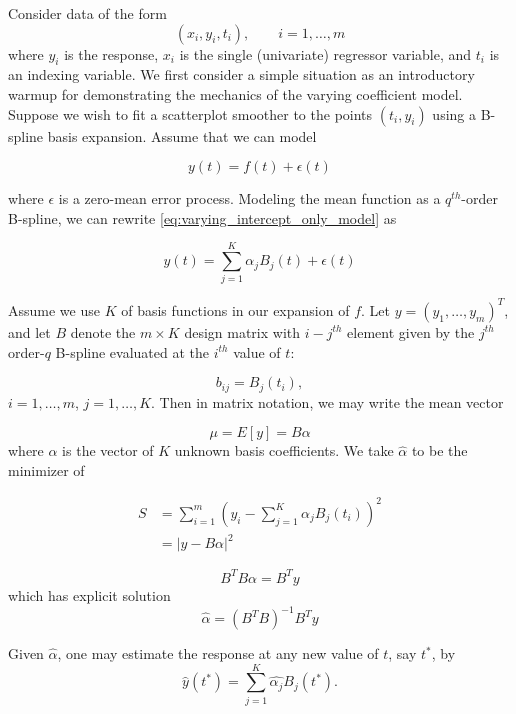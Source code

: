 \documentclass[12pt]{article}
\begin{document}
Consider data of the form 
\[
\left(x_i, y_i, t_i\right), \qquad i=1,\dots,m
\]
where $y_i$ is the response, $x_i$ is the single (univariate) regressor variable, and $t_i$ is an indexing variable. We first consider a simple situation as an introductory warmup for demonstrating the mechanics of the varying coefficient model. Suppose we wish to fit a scatterplot smoother to the points $\left(t_i, y_i\right)$ using a B-spline basis expansion. Assume that we can model 

\begin{equation} \label{eq:varying_intercept_only_model}
y\left(t\right) = f\left(t\right) + \epsilon\left(t \right)
\end{equation}

where $\epsilon$ is a zero-mean error process.  Modeling the mean function as a $q^{th}$-order B-spline, we can rewrite \ref{eq:varying_intercept_only_model} as

\begin{equation} \label{eq:varying_intercept_only_model_bspline}
y\left(t\right) = \sum_{j=1}^{K} \alpha_j B_j\left(t\right) + \epsilon\left(t \right)
\end{equation}

Assume we use $K$ of basis functions in our expansion of $f$. Let $y= \left(y_1,\dots,y_m\right)^T$, and let $B$ denote the $m \times K$ design matrix with $i-j^{th}$ element given by the $j^{th}$ order-$q$ B-spline evaluated at the $i^{th}$ value of $t$: 

\[
b_{ij} = B_j\left(t_i\right),
\]
$i=1,\dots,m$, $j=1,\dots,K$. Then in matrix notation, we may write the mean vector

\[
\mu = E\left[y\right] = B\alpha
\]
\noindent
where $\alpha$ is the vector of $K$ unknown basis coefficients. We take $\hat{\alpha}$ to be the minimizer of 

\begin{align}
S &= \sum_{i=1}^m \left(y_i - \sum_{j=1}^{K} \alpha_j B_j\left(t_i\right) \right)^2 \nonumber\\
&=\vert y - B\alpha \vert^2 \label{eq:S_varying_intercept_model}
\end{align}


\[
B^TB\alpha = B^Ty
\]
which has explicit solution
\[
\hat{\alpha} = \left(B^T B\right)^{-1}B^Ty
\]

Given $\hat{\alpha}$, one may estimate the response at any new value of $t$, say $t^*$, by 
\[
\hat{y}\left(t^*\right) = \sum_{j=1}^{K} \hat{\alpha_j}B_j\left(t^*\right).
\]
\end{document}
